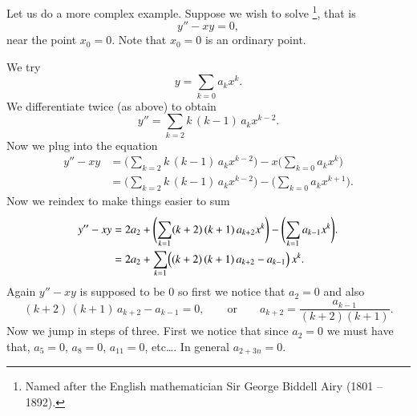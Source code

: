 \documentclass[12pt]{book}
\begin{document}
\begin{example}
Let us do a more complex example.  Suppose we wish to solve
\emph{}%
\footnote{Named after the English mathematician Sir George Biddell Airy
(1801 -- 1892).}, that is
\begin{equation*}
y'' - xy = 0 ,
\end{equation*}
near the point $x_0 = 0$.  Note that $x_0 = 0$ is an ordinary point.

We try
\begin{equation*}
y = \sum_{k=0} a_k x^k .
\end{equation*}
We differentiate twice (as above) to obtain
\begin{equation*}
y'' = \sum_{k=2} k\,(k-1) \, a_k x^{k-2} .
\end{equation*}
Now we plug into the equation
\begin{equation*}
\begin{split}
y''-xy &= 
\Biggl( \sum_{k=2} k\,(k-1) \, a_k x^{k-2}  \Biggr)
-
x
\Biggl( \sum_{k=0} a_k x^k \Biggr)
\\
&=
\Biggl( \sum_{k=2} k\,(k-1) \, a_k x^{k-2}  \Biggr)
-
\Biggl( \sum_{k=0} a_k x^{k+1} \Biggr) .
\end{split}
\end{equation*}
Now we reindex to make things easier to sum
\begin{equation*}
\begin{split}
y''-xy
&= 
2 a_2 + 
\Biggl( \sum_{k=1} (k+2)\,(k+1) \, a_{k+2} x^k  \Biggr)
-
\Biggl( \sum_{k=1} a_{k-1} x^k \Biggr) .
\\
&= 
2 a_2 + 
\sum_{k=1} \Bigl( (k+2)\,(k+1) \, a_{k+2} - a_{k-1} \Bigr) \, x^k .
\end{split}
\end{equation*}
Again $y''-xy$ is supposed to be 0 so first we notice that $a_2 = 0$
and also
\begin{equation*}
(k+2)\,(k+1) \,a_{k+2} - a_{k-1} = 0 ,
\qquad
\text{or}
\qquad
a_{k+2} = \frac{a_{k-1}}{(k+2)(k+1)} .
\end{equation*}
Now we jump in steps of three.  First we notice that since $a_2 = 0$
we must have that, $a_5 = 0$, $a_8 = 0$, $a_{11}=0$, etc\ldots.
In general $a_{2+3n} = 0$.


\end{example}
\end{document}
